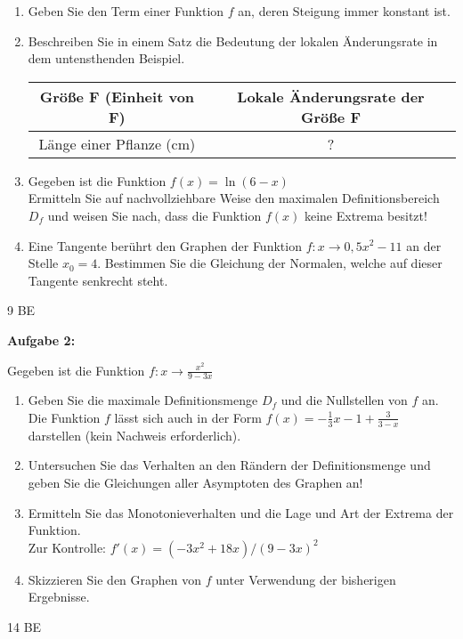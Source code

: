 \documentclass[a4paper,12pt]{article}
\newcommand{\Aufgabe}[1]{
  {
  \vspace*{0.5cm}
  \textsf{\textbf{Aufgabe #1}}
  \vspace*{0.2cm}
  
  }
}
\begin{document}
\begin{enumerate}[label={\alph*)}]
\item Geben Sie den Term einer Funktion $f$ an, deren Steigung immer konstant ist.
\item Beschreiben Sie in einem Satz die Bedeutung der lokalen Änderungsrate in dem untensthenden Beispiel. \\

  \begin{tabular}{|c|c|}
    \hline
    \large{\textbf{Größe F (Einheit von F)}} & \large{\textbf{Lokale Änderungsrate der Größe F}} \\[2.5ex] \hline 
    Länge einer Pflanze (cm) & ? \\[2.5ex] \hline
  \end{tabular}
  

\item 
  Gegeben ist die Funktion $f(x) = \ln(6-x)$ \\
Ermitteln Sie auf nachvollziehbare Weise den maximalen Definitionsbereich $D_f$ und weisen Sie nach, dass die Funktion $f(x)$ keine Extrema besitzt!


\item Eine Tangente berührt den Graphen der Funktion $f: x \rightarrow 0,5x^2 - 11$
an der Stelle $x_0 = 4$. Bestimmen Sie die Gleichung der Normalen, welche auf dieser Tangente senkrecht steht.
\end{enumerate}
\begin{flushright}9 BE \end{flushright}

\Aufgabe{2:} 
Gegeben ist die Funktion $f: x \rightarrow \frac{x^2}{9-3x}$
\begin{enumerate}[label={\alph*)}]
  \item Geben Sie die maximale Definitionsmenge $D_f$ und die Nullstellen von $f$ an.\\
Die Funktion $f$ lässt sich auch in der Form
    $f(x) = - \frac{1}{3}x - 1 + \frac{3}{3-x}$ 
darstellen (kein Nachweis erforderlich).


\item Untersuchen Sie das Verhalten an den Rändern der Definitionsmenge und geben Sie die Gleichungen aller Asymptoten des Graphen an!
\item Ermitteln Sie das Monotonieverhalten und die Lage und Art der Extrema der Funktion.\\
 \lbrack Zur Kontrolle: $f'(x) = (-3x^2+18x) / (9-3x)^2$\rbrack

\item Skizzieren Sie den Graphen von $f$ unter Verwendung der bisherigen Ergebnisse.

\end{enumerate}
\begin{flushright}14 BE \end{flushright}
\end{document}
